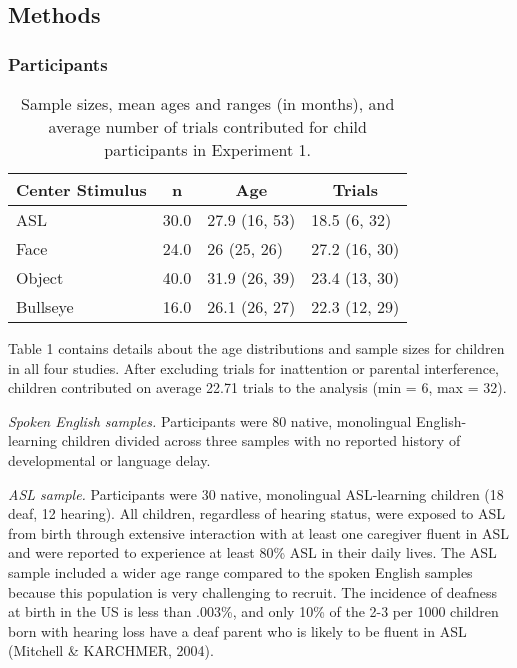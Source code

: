 \documentclass[,man,floatsintext]{apa6}
\begin{document}
\hypertarget{methods}{%
\subsection{Methods}\label{methods}}

\hypertarget{participants}{%
\subsubsection{Participants}\label{participants}}

\begin{table}[tbp]
\begin{center}
\begin{threeparttable}
\caption{\label{tab:trio make participants table}Sample sizes, mean ages and ranges (in months), and average number of trials contributed for child participants in Experiment 1.}
\begin{tabular}{llll}
\toprule
Center Stimulus & \multicolumn{1}{c}{n} & \multicolumn{1}{c}{Age} & \multicolumn{1}{c}{Trials}\\
\midrule
ASL & 30.0 & 27.9 (16, 53) & 18.5 (6, 32)\\
Face & 24.0 & 26 (25, 26) & 27.2 (16, 30)\\
Object & 40.0 & 31.9 (26, 39) & 23.4 (13, 30)\\
Bullseye & 16.0 & 26.1 (26, 27) & 22.3 (12, 29)\\
\bottomrule
\end{tabular}
\end{threeparttable}
\end{center}
\end{table}

Table 1 contains details about the age distributions and sample sizes for children in all four studies. After excluding trials for inattention or parental interference, children contributed on average 22.71 trials to the analysis (min = 6, max = 32).

\emph{Spoken English samples.} Participants were 80 native, monolingual English-learning children divided across three samples with no reported history of developmental or language delay.

\emph{ASL sample.} Participants were 30 native, monolingual ASL-learning children (18 deaf, 12 hearing). All children, regardless of hearing status, were exposed to ASL from birth through extensive interaction with at least one caregiver fluent in ASL and were reported to experience at least 80\% ASL in their daily lives. The ASL sample included a wider age range compared to the spoken English samples because this population is very challenging to recruit. The incidence of deafness at birth in the US is less than .003\%, and only 10\% of the 2-3 per 1000 children born with hearing loss have a deaf parent who is likely to be fluent in ASL (Mitchell \& KARCHMER, 2004).
\end{document}
